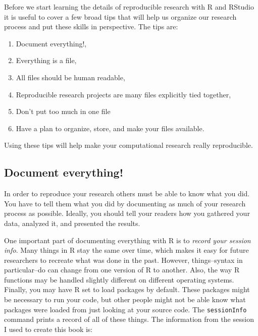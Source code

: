 Before we start learning the details of reproducible research with R and RStudio it is useful to cover a few broad tips that will help us organize our research process and put these skills in perspective. The tips are:

\begin{enumerate}
    \item Document everything!,
    \item Everything is a file,
    \item All files should be human readable,
    \item Reproducible research projects are many files explicitly tied together,
    \item Don't put too much in one file
    \item Have a plan to organize, store, and make your files available.    
\end{enumerate}

\noindent Using these tips will help make your computational research really reproducible.

\subsection{Document everything!}

In order to reproduce your research others must be able to know what you did. You have to tell them what you did by documenting as much of your research process as possible. Ideally, you should tell your readers how you gathered your data, analyzed it, and presented the results.

One important part of documenting everything with R is to \emph{record your session info}. Many things in R stay the same over time, which makes it easy for future researchers to recreate what was done in the past. However, things--syntax in particular--do can change from one version of R to another. Also, the way R functions may be handled slightly different on different operating systems. Finally, you may have R set to load packages by default. These packages might be necessary to run your code, but other people might not be able know what packages were loaded from just looking at your source code. The \texttt{sessionInfo} command prints a record of all of these things. The information from the session I used to create this book is:

